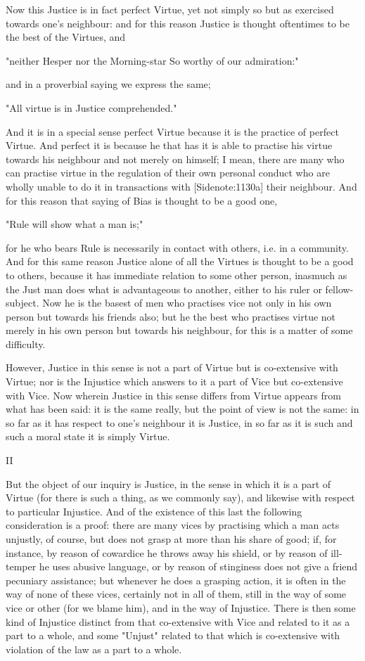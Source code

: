 Now this Justice is in fact perfect Virtue, yet not simply so but as
exercised towards one's neighbour: and for this reason Justice is
thought oftentimes to be the best of the Virtues, and

  "neither Hesper nor the Morning-star
  So worthy of our admiration:"

and in a proverbial saying we express the same;

  "All virtue is in Justice comprehended."

And it is in a special sense perfect Virtue because it is the practice
of perfect Virtue. And perfect it is because he that has it is able to
practise his virtue towards his neighbour and not merely on himself; I
mean, there are many who can practise virtue in the regulation of their
own personal conduct who are wholly unable to do it in transactions with
[Sidenote:1130a] their neighbour. And for this reason that saying of
Bias is thought to be a good one,

  "Rule will show what a man is;"

for he who bears Rule is necessarily in contact with others, i.e. in a
community. And for this same reason Justice alone of all the Virtues is
thought to be a good to others, because it has immediate relation to
some other person, inasmuch as the Just man does what is advantageous to
another, either to his ruler or fellow-subject. Now he is the basest
of men who practises vice not only in his own person but towards his
friends also; but he the best who practises virtue not merely in his
own person but towards his neighbour, for this is a matter of some
difficulty.

However, Justice in this sense is not a part of Virtue but is
co-extensive with Virtue; nor is the Injustice which answers to it a
part of Vice but co-extensive with Vice. Now wherein Justice in this
sense differs from Virtue appears from what has been said: it is the
same really, but the point of view is not the same: in so far as it has
respect to one's neighbour it is Justice, in so far as it is such and
such a moral state it is simply Virtue.

II

But the object of our inquiry is Justice, in the sense in which it is
a part of Virtue (for there is such a thing, as we commonly say), and
likewise with respect to particular Injustice. And of the existence of
this last the following consideration is a proof: there are many vices
by practising which a man acts unjustly, of course, but does not grasp
at more than his share of good; if, for instance, by reason of cowardice
he throws away his shield, or by reason of ill-temper he uses abusive
language, or by reason of stinginess does not give a friend pecuniary
assistance; but whenever he does a grasping action, it is often in the
way of none of these vices, certainly not in all of them, still in
the way of some vice or other (for we blame him), and in the way of
Injustice. There is then some kind of Injustice distinct from that
co-extensive with Vice and related to it as a part to a whole, and some
"Unjust" related to that which is co-extensive with violation of the law
as a part to a whole.

